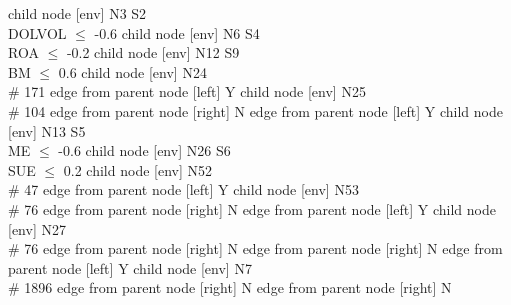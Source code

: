       child { node [env] {N3  S2 \\ DOLVOL $\leq$ -0.6} 
            child { node [env] {N6  S4 \\ ROA $\leq$ -0.2} 
                  child { node [env] {N12  S9 \\ BM $\leq$ 0.6} 
                        child { node [env] {N24   \\ \# 171 } 
                              edge from parent node [left] {Y} 
                        }
                        child { node [env] {N25   \\ \# 104 } 
                              edge from parent node [right] {N} 
                        }
                        edge from parent node [left] {Y} 
                  }
                  child { node [env] {N13  S5 \\ ME $\leq$ -0.6} 
                        child { node [env] {N26  S6 \\ SUE $\leq$ 0.2} 
                              child { node [env] {N52   \\ \# 47 } 
                                    edge from parent node [left] {Y} 
                              }
                              child { node [env] {N53   \\ \# 76 } 
                                    edge from parent node [right] {N} 
                              }
                              edge from parent node [left] {Y} 
                        }
                        child { node [env] {N27   \\ \# 76 } 
                              edge from parent node [right] {N} 
                        }
                        edge from parent node [right] {N} 
                  }
                  edge from parent node [left] {Y} 
            }
            child { node [env] {N7   \\ \# 1896 } 
                  edge from parent node [right] {N} 
            }
            edge from parent node [right] {N} 
      }

